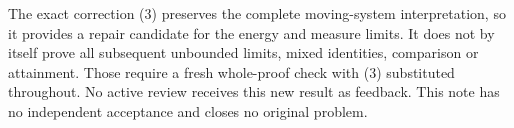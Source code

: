 \documentclass[11pt]{article}
\begin{document}
The exact correction (3) preserves the complete moving-system
interpretation, so it provides a repair candidate for the energy and
measure limits. It does not by itself prove all subsequent unbounded
limits, mixed identities, comparison or attainment. Those require a
fresh whole-proof check with (3) substituted throughout. No active
review receives this new result as feedback. This note has no
independent acceptance and closes no original problem.
\end{document}
